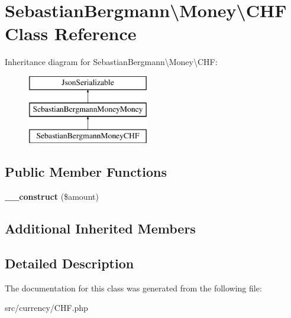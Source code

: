\hypertarget{classSebastianBergmann_1_1Money_1_1CHF}{}\section{Sebastian\+Bergmann\textbackslash{}Money\textbackslash{}C\+H\+F Class Reference}
\label{classSebastianBergmann_1_1Money_1_1CHF}
Inheritance diagram for Sebastian\+Bergmann\textbackslash{}Money\textbackslash{}C\+H\+F\+:\begin{figure}[H]
\begin{center}
\leavevmode
\includegraphics[height=3.000000cm]{classSebastianBergmann_1_1Money_1_1CHF}
\end{center}
\end{figure}
\subsection*{Public Member Functions}
\begin{DoxyCompactItemize}
\item 
\hypertarget{classSebastianBergmann_1_1Money_1_1CHF_a55b70cb1e0cc1ec2537401313fef4ef9}{}{\bfseries \+\_\+\+\_\+construct} (\$amount)\label{classSebastianBergmann_1_1Money_1_1CHF_a55b70cb1e0cc1ec2537401313fef4ef9}

\end{DoxyCompactItemize}
\subsection*{Additional Inherited Members}


\subsection{Detailed Description}


The documentation for this class was generated from the following file\+:\begin{DoxyCompactItemize}
\item 
src/currency/C\+H\+F.\+php\end{DoxyCompactItemize}
